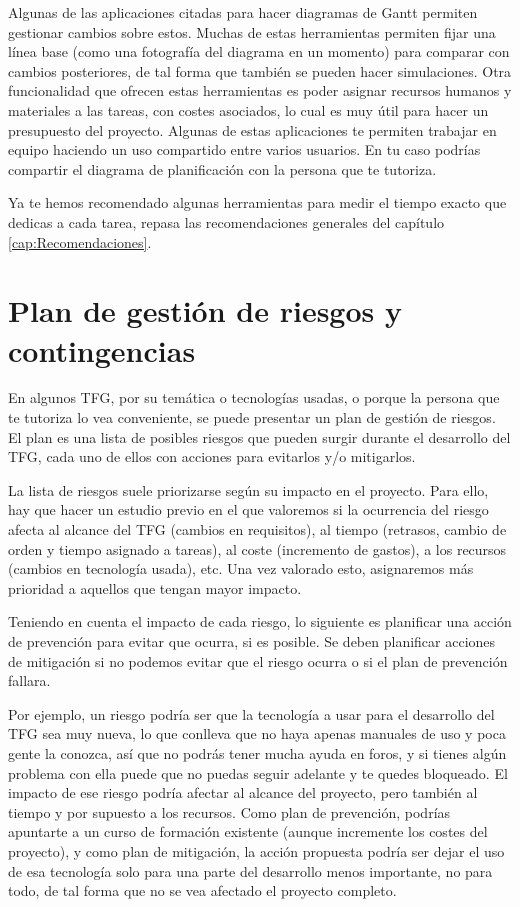 Algunas de las aplicaciones citadas para hacer diagramas de Gantt permiten gestionar cambios sobre estos. Muchas de estas herramientas permiten fijar una línea base (como una fotografía del diagrama en un momento) para comparar con cambios posteriores, de tal forma que también se pueden hacer simulaciones. Otra funcionalidad que ofrecen estas herramientas es poder asignar recursos humanos y materiales a las tareas, con costes asociados, lo cual es muy útil para hacer un presupuesto del proyecto. Algunas de estas aplicaciones te permiten trabajar en equipo haciendo un uso compartido entre varios usuarios. En tu caso podrías compartir el diagrama de planificación con la persona que te tutoriza.

Ya te hemos recomendado algunas herramientas para medir el tiempo exacto que dedicas a cada tarea, repasa las recomendaciones generales del capítulo \ref{cap:Recomendaciones}.



\section{Plan de gestión de riesgos y contingencias}

En algunos TFG, por su temática o tecnologías usadas, o porque la persona que te tutoriza lo vea conveniente, se puede presentar un plan de gestión de riesgos. El plan es una lista de posibles riesgos que pueden surgir durante el desarrollo del TFG, cada uno de ellos con acciones para evitarlos y/o mitigarlos.


La lista de riesgos suele priorizarse según su impacto en el proyecto. Para ello, hay que hacer un estudio previo en el que valoremos si la ocurrencia del riesgo afecta al alcance del TFG (cambios en requisitos), al tiempo (retrasos, cambio de orden y tiempo asignado a tareas), al coste (incremento de gastos), a los recursos (cambios en tecnología usada), etc. Una vez valorado esto, asignaremos más prioridad a aquellos que tengan mayor impacto. 

Teniendo en cuenta el impacto de cada riesgo, lo siguiente es planificar una acción de prevención para evitar que ocurra, si es posible. Se deben planificar acciones de mitigación si no podemos evitar que el riesgo ocurra o si el plan de prevención fallara.

Por ejemplo, un riesgo podría ser que la tecnología a usar para el desarrollo del TFG sea muy nueva, lo que conlleva que no haya apenas manuales de uso y poca gente la conozca, así que no podrás tener mucha ayuda en foros, y  si tienes algún problema con ella puede que no puedas seguir adelante y te quedes bloqueado. El impacto de ese riesgo podría afectar al alcance del proyecto, pero también al tiempo y por supuesto a los recursos. Como plan de prevención, podrías apuntarte a un curso de formación existente (aunque incremente los costes del proyecto), y como plan de mitigación, la acción propuesta podría ser dejar el uso de esa tecnología solo para una parte del desarrollo menos importante, no para todo, de tal forma que no se vea afectado el proyecto completo.

